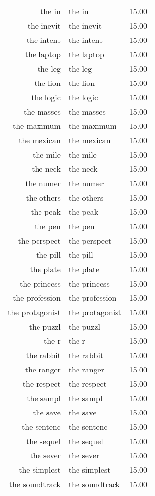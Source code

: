 \begin{table}[ht]
\begin{tabular}{rlr}
  the in & the in & 15.00 \\ 
  the inevit & the inevit & 15.00 \\ 
  the intens & the intens & 15.00 \\ 
  the laptop & the laptop & 15.00 \\ 
  the leg & the leg & 15.00 \\ 
  the lion & the lion & 15.00 \\ 
  the logic & the logic & 15.00 \\ 
  the masses & the masses & 15.00 \\ 
  the maximum & the maximum & 15.00 \\ 
  the mexican & the mexican & 15.00 \\ 
  the mile & the mile & 15.00 \\ 
  the neck & the neck & 15.00 \\ 
  the numer & the numer & 15.00 \\ 
  the others & the others & 15.00 \\ 
  the peak & the peak & 15.00 \\ 
  the pen & the pen & 15.00 \\ 
  the perspect & the perspect & 15.00 \\ 
  the pill & the pill & 15.00 \\ 
  the plate & the plate & 15.00 \\ 
  the princess & the princess & 15.00 \\ 
  the profession & the profession & 15.00 \\ 
  the protagonist & the protagonist & 15.00 \\ 
  the puzzl & the puzzl & 15.00 \\ 
  the r & the r & 15.00 \\ 
  the rabbit & the rabbit & 15.00 \\ 
  the ranger & the ranger & 15.00 \\ 
  the respect & the respect & 15.00 \\ 
  the sampl & the sampl & 15.00 \\ 
  the save & the save & 15.00 \\ 
  the sentenc & the sentenc & 15.00 \\ 
  the sequel & the sequel & 15.00 \\ 
  the sever & the sever & 15.00 \\ 
  the simplest & the simplest & 15.00 \\ 
  the soundtrack & the soundtrack & 15.00 \\ 

\end{tabular}
\end{table}
